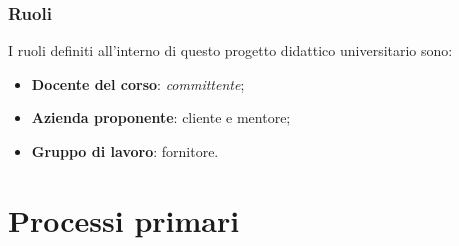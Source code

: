\documentclass[10pt, a4paper]{article}
\begin{document}
\subsubsection{Ruoli}
I ruoli definiti all'interno di questo progetto didattico universitario sono:
\begin{itemize}
    \item \textbf{Docente del corso}: \textit{committente\pg};
    \item \textbf{Azienda proponente}: cliente e mentore;
    \item \textbf{Gruppo di lavoro}: fornitore. 
\end{itemize}

\newpage
\section{Processi primari}
\end{document}
